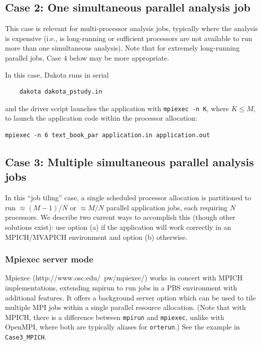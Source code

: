 \subsection{Case 2: One simultaneous parallel analysis job}

This case is relevant for multi-processor analysis jobs, typically
where the analysis is expensive (i.e., is long-running or sufficient
processors are not available to run more than one simultaneous
analysis).  Note that for extremely long-running parallel jobs, Case 4
below may be more appropriate.

In this case, Dakota runs in serial
\begin{verbatim}
    dakota dakota_pstudy.in
\end{verbatim}
and the driver script launches the application with {\tt mpiexec -n
K}, where $K \leq M$, to launch the application code within the
processor allocation:
\begin{verbatim}
mpiexec -n 6 text_book_par application.in application.out
\end{verbatim}

\subsection{Case 3: Multiple simultaneous parallel analysis jobs}

In this ``job tiling'' case, a single scheduled processor allocation
is partitioned to run $\approx (M-1)/N$ or $\approx M/N$ parallel
application jobs, each requiring $N$ processors.  We describe two
current ways to accomplish this (though other solutions exist): use
option (a) if the application will work correctly in an MPICH/MVAPICH
environment and option (b) otherwise.

\subsubsection{Mpiexec server mode}

Mpiexec (http://www.osc.edu/~pw/mpiexec/) works in concert with MPICH
implementations, extending mpirun to run jobs in a PBS environment
with additional features.  It offers a background server option which
can be used to tile multiple MPI jobs within a single parallel
resource allocation.  (Note that with MPICH, there is a difference
between {\tt mpirun} and {\tt mpiexec}, unlike with OpenMPI, where
both are typically aliases for {\tt orterun}.)  See the example in
\texttt{Case3\_MPICH}.

